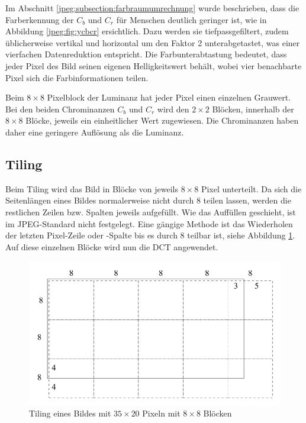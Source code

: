 Im Abschnitt \ref{jpeg:subsection:farbraumumrechnung} wurde beschrieben, dass die Farberkennung der \(C_b\) und \(C_r\) für Menschen deutlich geringer ist, wie in Abbildung \ref{jpeg:fig:ycbcr} ersichtlich.
Dazu werden sie tiefpassgefiltert, zudem üblicherweise vertikal und horizontal um den Faktor 2 unterabgetastet, was einer vierfachen Datenreduktion entspricht.
Die Farbunterabtastung bedeutet, dass jeder Pixel des Bild seinen eigenen Helligkeitswert behält, wobei vier benachbarte Pixel sich die Farbinformationen teilen.

\begin{beispiel}
Beim \(8\times8\) Pixelblock der Luminanz hat jeder Pixel einen einzelnen Grauwert.
Bei den beiden Chrominanzen \(C_b\) und \(C_r\) wird den \(2\times2\) Blöcken, innerhalb der \(8\times8\) Blöcke, jeweils ein einheitlicher Wert zugewiesen.
Die Chrominanzen haben daher eine geringere Auflösung als die Luminanz.
\end{beispiel}

\subsection{Tiling
\label{jpeg:subsection:tiling}}
%
Beim Tiling wird das Bild in Blöcke von jeweils \(8\times8\) Pixel unterteilt.
Da sich die Seitenlängen eines Bildes normalerweise nicht durch 8 teilen lassen, werden die restlichen Zeilen bzw. Spalten jeweils aufgefüllt.
Wie das Auffüllen geschieht, ist im JPEG-Standard nicht festgelegt.
Eine gängige Methode ist das Wiederholen der letzten Pixel-Zeile oder -Spalte bis es durch 8 teilbar ist, siehe Abbildung \ref{jpeg:fig:tiling}.
Auf diese einzelnen Blöcke wird nun die DCT angewendet.

\begin{figure}
    \centering
    \includegraphics[width=120mm]{papers/jpeg/pictures/unterteilung.pdf}
    \caption{Tiling eines Bildes mit \(35\times20\) Pixeln mit \(8\times8\) Blöcken
        \label{jpeg:fig:tiling}}
\end{figure}

